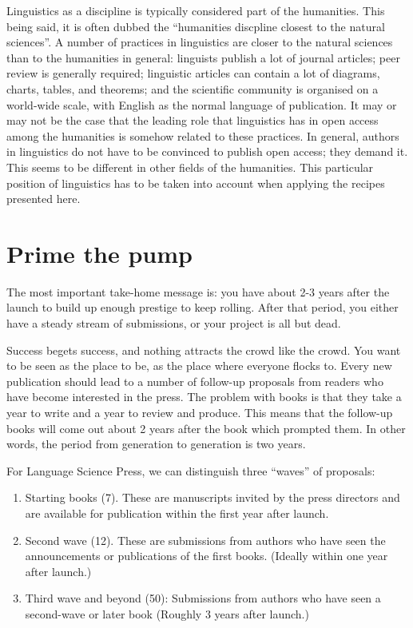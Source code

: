 \documentclass[nonflat,modfonts,output=book] {langsci/langscibook}
\begin{document}
Linguistics as a discipline is typically considered part of the humanities. This being said, it is often dubbed the ``humanities discpline closest to the natural sciences''. A number of practices in linguistics are closer to the natural sciences than to the humanities in general: linguists publish a lot of journal articles; peer review is generally required; linguistic articles can contain a lot of diagrams, charts, tables, and theorems; and the scientific community is organised on a world-wide scale, with English as the normal language of publication. It may or may not be the case that the leading role that linguistics has in open access among the humanities is somehow related to these practices. In general, authors in linguistics do not have to be convinced to publish open access; they demand it. This seems to be different in other fields of the humanities. This particular position of linguistics has to be taken into account when applying the recipes presented here. 


\chapter{Prime the pump}

The most important take-home message is: you have about 2-3 years after the launch to build up enough prestige to keep rolling. 
After that period, you either have a steady stream of submissions, or your project is all but dead. 

Success begets success, and nothing attracts the crowd like the crowd. You want to be seen as the place to be, as the place where everyone  flocks to. Every new publication should lead to a number of follow-up proposals from readers who have become interested in the press. The problem with books is that they take a year to write and a year to review and produce. This means that the follow-up books will come out about 2 years after the book which prompted them. In other words, the period from generation to generation is two years. 

For Language Science Press, we can distinguish three ``waves'' of proposals: 

\begin{enumerate}
 \item Starting books (7). These are manuscripts invited by the press directors and are available for publication within the first year after launch.
 \item Second wave (12). These are submissions from authors who have seen the announcements or publications of the first books. (Ideally within one  year after launch.)
 \item Third wave and beyond (50): Submissions from authors who have seen a second-wave or later book (Roughly 3 years after launch.)
\end{enumerate} 
\end{document}
